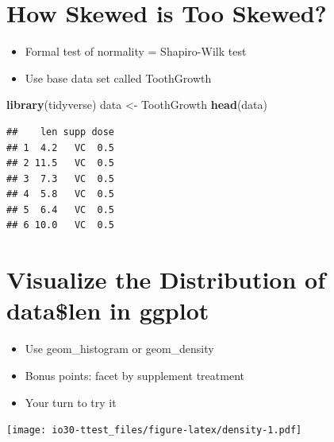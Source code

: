 \documentclass[
]{book}
\newenvironment{Shaded}{\begin{snugshade}}{\end{snugshade}}
\newcommand{\CommentTok}[1]{\textcolor[rgb]{0.56,0.35,0.01}{\textit{#1}}}
\newcommand{\DataTypeTok}[1]{\textcolor[rgb]{0.13,0.29,0.53}{#1}}
\newcommand{\KeywordTok}[1]{\textcolor[rgb]{0.13,0.29,0.53}{\textbf{#1}}}
\newcommand{\NormalTok}[1]{#1}
\newcommand{\OperatorTok}[1]{\textcolor[rgb]{0.81,0.36,0.00}{\textbf{#1}}}
\newcommand{\StringTok}[1]{\textcolor[rgb]{0.31,0.60,0.02}{#1}}
\providecommand{\tightlist}{%
  \setlength{\itemsep}{0pt}\setlength{\parskip}{0pt}}
\begin{document}
\hypertarget{how-skewed-is-too-skewed}{%
\section{How Skewed is Too Skewed?}\label{how-skewed-is-too-skewed}}

\begin{itemize}
\tightlist
\item
  Formal test of normality = Shapiro-Wilk test
\item
  Use base data set called ToothGrowth
\end{itemize}

\begin{Shaded}
\begin{Highlighting}[]
\KeywordTok{library}\NormalTok{(tidyverse)}
\NormalTok{data <-}\StringTok{ }\NormalTok{ToothGrowth}
\KeywordTok{head}\NormalTok{(data)}
\end{Highlighting}
\end{Shaded}

\begin{verbatim}
##    len supp dose
## 1  4.2   VC  0.5
## 2 11.5   VC  0.5
## 3  7.3   VC  0.5
## 4  5.8   VC  0.5
## 5  6.4   VC  0.5
## 6 10.0   VC  0.5
\end{verbatim}

\hypertarget{visualize-the-distribution-of-datalen-in-ggplot}{%
\section{Visualize the Distribution of data\$len in ggplot}\label{visualize-the-distribution-of-datalen-in-ggplot}}

\begin{itemize}
\tightlist
\item
  Use geom\_histogram or geom\_density
\item
  Bonus points: facet by supplement treatment
\item
  Your turn to try it
\end{itemize}

\texttt{[image: io30-ttest\_files/figure-latex/density-1.pdf]}

\begin{Shaded}
\end{Shaded}
\end{document}
